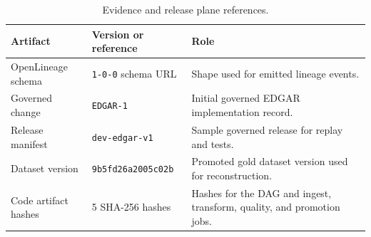 \begin{table}[H]
  \centering
  \caption{Evidence and release plane references.}
  \label{tab:appendix-evidence-plane}
  \renewcommand{\arraystretch}{1.12}
  \begin{tabularx}{\textwidth}{@{}p{}p{}X@{}}
    \toprule
    \textbf{Artifact} & \textbf{Version or reference} & \textbf{Role} \\
    \midrule
    OpenLineage schema & \texttt{1-0-0} schema URL & Shape used for emitted lineage events. \\
    Governed change & \texttt{EDGAR-1} & Initial governed EDGAR implementation record. \\
    Release manifest & \texttt{dev-edgar-v1} & Sample governed release for replay and tests. \\
    Dataset version & \texttt{9b5fd26a2005c02b} & Promoted gold dataset version used for reconstruction. \\
    Code artifact hashes & 5 SHA-256 hashes & Hashes for the DAG and ingest, transform, quality, and promotion jobs. \\
    \bottomrule
  \end{tabularx}
\end{table}
